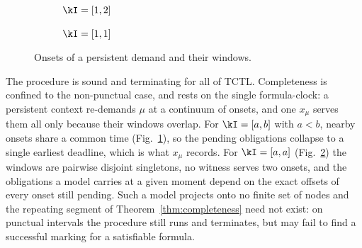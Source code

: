 \begin{figure}[t]
\centering
\begin{subfigure}[t]{0.47\textwidth}
\centering
{}
\caption{$\kI=[1,2]$}\label{fig:non_punctual}
\end{subfigure}
\hfill
\begin{subfigure}[t]{0.47\textwidth}
\centering
{}
\caption{$\kI=[1,1]$}\label{fig:punctual}
\end{subfigure}
\caption{Onsets of a persistent demand and their windows.}
\label{fig:punctual_vs_nonpunctual}
\end{figure}

The procedure is sound and terminating for all of TCTL. Completeness is confined to the non-punctual
case, and rests on the single formula-clock: a persistent context re-demands $\mu$ at a continuum of
onsets, and one $x_\mu$ serves them all only because their windows overlap. For $\kI=[a,b]$ with
$a<b$, nearby onsets share a common time (Fig.~\ref{fig:non_punctual}), so the pending obligations
collapse to a single earliest deadline, which is what $x_\mu$ records. For $\kI=[a,a]$
(Fig.~\ref{fig:punctual}) the windows are pairwise disjoint singletons, no witness serves two onsets,
and the obligations a model carries at a given moment depend on the exact offsets of every onset still
pending. Such a model projects onto no finite set of nodes and the repeating segment of
Theorem~\ref{thm:completeness} need not exist: on punctual intervals the procedure still runs and
terminates, but may fail to find a successful marking for a satisfiable formula.

